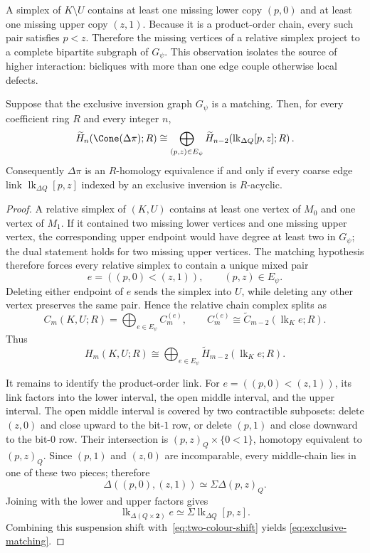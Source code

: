A simplex of $K\setminus U$ contains at least one missing lower copy $(p,0)$
and at least one missing upper copy $(z,1)$.  Because it is a product-order
chain, every such pair satisfies $p<z$.  Therefore the missing vertices of a
relative simplex project to a complete bipartite subgraph of $G_\psi$.  This
observation isolates the source of higher interaction: bicliques with more than
one edge couple otherwise local defects.

\begin{theorem}
\label{thm:exclusive-matching}
Suppose that the exclusive inversion graph $G_\psi$ is a matching.  Then, for
every coefficient ring $R$ and every integer $n$,
\begin{equation}
\widetilde H_n\!\left(\Cone(\Delta\pi);R\right)
\cong
\bigoplus_{(p,z)\in E_\psi}
\widetilde H_{n-2}\!\left(
\operatorname{lk}_{\Delta Q}[p,z];R
\right).
\label{eq:exclusive-matching}
\end{equation}
Consequently $\Delta\pi$ is an $R$-homology equivalence if and only if every
coarse edge link $\operatorname{lk}_{\Delta Q}[p,z]$ indexed by an exclusive
inversion is $R$-acyclic.
\end{theorem}

\begin{proof}
A relative simplex of $(K,U)$ contains at least one vertex of $M_0$ and one
vertex of $M_1$.  If it contained two missing lower vertices and one missing
upper vertex, the corresponding upper endpoint would have degree at least two
in $G_\psi$; the dual statement holds for two missing upper vertices.  The
matching hypothesis therefore forces every relative simplex to contain a unique
mixed pair
\[
e=((p,0)<(z,1)),\qquad (p,z)\in E_\psi.
\]
Deleting either endpoint of $e$ sends the simplex into $U$, while deleting any
other vertex preserves the same pair.  Hence the relative chain complex splits
as
\[
C_m(K,U;R)=\bigoplus_{e\in E_\psi}C_m^{(e)},
\qquad
C_m^{(e)}\cong
\widetilde C_{m-2}(\operatorname{lk}_K e;R).
\]
Thus
\[
H_m(K,U;R)\cong
\bigoplus_{e\in E_\psi}
\widetilde H_{m-2}(\operatorname{lk}_K e;R).
\]

It remains to identify the product-order link.  For
$e=((p,0)<(z,1))$, its link factors into the lower interval, the open middle
interval, and the upper interval.  The open middle interval is covered by two
contractible subposets: delete $(z,0)$ and close upward to the bit-$1$ row, or
delete $(p,1)$ and close downward to the bit-$0$ row.  Their intersection is
$(p,z)_Q\times\{0<1\}$, homotopy equivalent to $(p,z)_Q$.  Since $(p,1)$ and
$(z,0)$ are incomparable, every middle-chain lies in one of these two pieces;
therefore
\[
\Delta((p,0),(z,1))\simeq\Sigma\Delta(p,z)_Q.
\]
Joining with the lower and upper factors gives
\[
\operatorname{lk}_{\Delta(Q\times\mathbf2)}e
\simeq
\Sigma\operatorname{lk}_{\Delta Q}[p,z].
\]
Combining this suspension shift with~\eqref{eq:two-colour-shift} yields
\eqref{eq:exclusive-matching}.
\end{proof}


